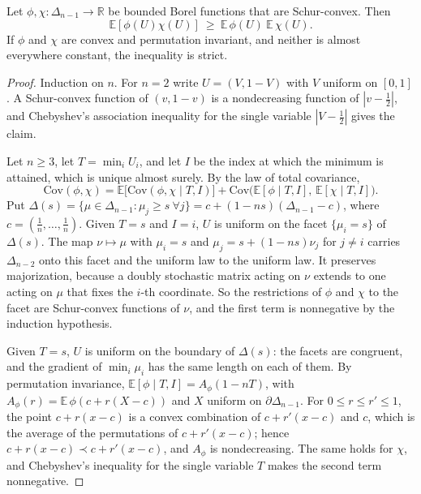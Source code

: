 \begin{lemma}\label{shB:lem:schur}
Let $\phi,\chi:\Delta_{n-1}\to\mathbb R$ be bounded Borel functions that are Schur-convex. Then
\[
\mathbb E[\phi(U)\chi(U)]\ \ge\ \mathbb E\,\phi(U)\ \mathbb E\,\chi(U).
\]
If $\phi$ and $\chi$ are convex and permutation invariant, and neither is almost everywhere constant, the inequality is strict.
\end{lemma}

\begin{proof}
Induction on $n$. For $n=2$ write $U=(V,1-V)$ with $V$ uniform on $[0,1]$. A Schur-convex function of $(v,1-v)$ is a nondecreasing function of $|v-\frac12|$, and Chebyshev's association inequality for the single variable $|V-\frac12|$ gives the claim.

Let $n\ge3$, let $T=\min_iU_i$, and let $I$ be the index at which the minimum is attained, which is unique almost surely. By the law of total covariance,
\[
\mathrm{Cov}(\phi,\chi)=\mathbb E\big[\mathrm{Cov}(\phi,\chi\mid T,I)\big]+\mathrm{Cov}\big(\mathbb E[\phi\mid T,I],\,\mathbb E[\chi\mid T,I]\big).
\]
Put $\Delta(s)=\{\mu\in\Delta_{n-1}:\mu_j\ge s\ \forall j\}=c+(1-ns)(\Delta_{n-1}-c)$, where $c=(\frac1n,\dots,\frac1n)$. Given $T=s$ and $I=i$, $U$ is uniform on the facet $\{\mu_i=s\}$ of $\Delta(s)$. The map $\nu\mapsto\mu$ with $\mu_i=s$ and $\mu_j=s+(1-ns)\nu_j$ for $j\ne i$ carries $\Delta_{n-2}$ onto this facet and the uniform law to the uniform law. It preserves majorization, because a doubly stochastic matrix acting on $\nu$ extends to one acting on $\mu$ that fixes the $i$-th coordinate. So the restrictions of $\phi$ and $\chi$ to the facet are Schur-convex functions of $\nu$, and the first term is nonnegative by the induction hypothesis.

Given $T=s$, $U$ is uniform on the boundary of $\Delta(s)$: the facets are congruent, and the gradient of $\min_i\mu_i$ has the same length on each of them. By permutation invariance, $\mathbb E[\phi\mid T,I]=A_\phi(1-nT)$, with $A_\phi(r)=\mathbb E\,\phi(c+r(X-c))$ and $X$ uniform on $\partial\Delta_{n-1}$. For $0\le r\le r'\le1$, the point $c+r(x-c)$ is a convex combination of $c+r'(x-c)$ and $c$, which is the average of the permutations of $c+r'(x-c)$; hence $c+r(x-c)\prec c+r'(x-c)$, and $A_\phi$ is nondecreasing. The same holds for $\chi$, and Chebyshev's inequality for the single variable $T$ makes the second term nonnegative.


\end{proof}
